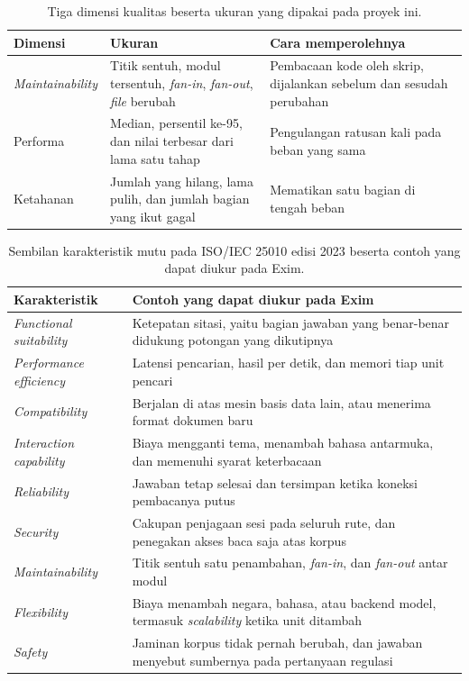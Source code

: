 \begin{table}[htbp]
  \centering
  \caption{Tiga dimensi kualitas beserta ukuran yang dipakai pada proyek ini.}
  \label{tab:dimensi-ukuran}
  \begin{tabularx}{\textwidth}{|l|X|X|}
    \hline
    \textbf{Dimensi} & \textbf{Ukuran} & \textbf{Cara memperolehnya} \\
    \hline
    \textit{Maintainability} & Titik sentuh, modul tersentuh, \textit{fan-in}, \textit{fan-out}, \textit{file} berubah & Pembacaan kode oleh skrip, dijalankan sebelum dan sesudah perubahan \\
    \hline
    Performa & Median, persentil ke-95, dan nilai terbesar dari lama satu tahap & Pengulangan ratusan kali pada beban yang sama \\
    \hline
    Ketahanan & Jumlah yang hilang, lama pulih, dan jumlah bagian yang ikut gagal & Mematikan satu bagian di tengah beban \\
    \hline
  \end{tabularx}
\end{table}

\begin{table}[htbp]
  \centering
  \caption{Sembilan karakteristik mutu pada ISO/IEC 25010 edisi 2023 beserta
    contoh yang dapat diukur pada Exim.}
  \label{tab:dimensi-iso}
  \begin{tabularx}{\textwidth}{|l|X|}
    \hline
    \textbf{Karakteristik} & \textbf{Contoh yang dapat diukur pada Exim} \\
    \hline
    \textit{Functional suitability} & Ketepatan sitasi, yaitu bagian jawaban yang benar-benar didukung potongan yang dikutipnya \\
    \hline
    \textit{Performance efficiency} & Latensi pencarian, hasil per detik, dan memori tiap unit pencari \\
    \hline
    \textit{Compatibility} & Berjalan di atas mesin basis data lain, atau menerima format dokumen baru \\
    \hline
    \textit{Interaction capability} & Biaya mengganti tema, menambah bahasa antarmuka, dan memenuhi syarat keterbacaan \\
    \hline
    \textit{Reliability} & Jawaban tetap selesai dan tersimpan ketika koneksi pembacanya putus \\
    \hline
    \textit{Security} & Cakupan penjagaan sesi pada seluruh rute, dan penegakan akses baca saja atas korpus \\
    \hline
    \textit{Maintainability} & Titik sentuh satu penambahan, \textit{fan-in}, dan \textit{fan-out} antar modul \\
    \hline
    \textit{Flexibility} & Biaya menambah negara, bahasa, atau backend model, termasuk \textit{scalability} ketika unit ditambah \\
    \hline
    \textit{Safety} & Jaminan korpus tidak pernah berubah, dan jawaban menyebut sumbernya pada pertanyaan regulasi \\
    \hline
  \end{tabularx}
\end{table}

